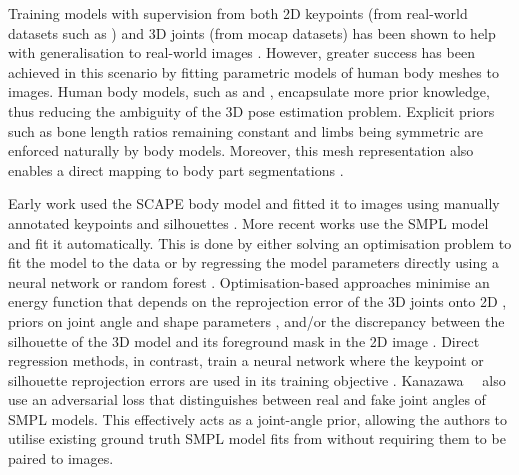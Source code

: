 \documentclass[10pt,twocolumn,letterpaper]{article}
\begin{document}
Training models with supervision from both 2D keypoints (from real-world datasets such as \cite{lin_eccv_2014, andriluka_cvpr_2014, johnson_bmvc_2010}) and 3D joints (from mocap datasets) has been shown to help with generalisation to real-world images \cite{zhou_iccv_2017, rogez_cvpr_2017, mehta_3dv_2017, dabral_eccv_2018, sun_iccv_2017, sun_eccv_2018}.
However, greater success has been achieved in this scenario by fitting parametric models of human body meshes to images.
Human body models, such as \cite{loper_tog_2015} and \cite{anguelov_tog_2005}, encapsulate more prior knowledge, thus reducing the ambiguity of the 3D pose estimation problem.
Explicit priors such as bone length ratios remaining constant \cite{zhou_iccv_2017, dabral_eccv_2018} and limbs being symmetric \cite{dabral_eccv_2018} are enforced naturally by body models.
Moreover, this mesh representation also enables a direct mapping to body part segmentations \cite{lassner_cvpr_2017, pavlakos_cvpr_2018, kanazawa_cvpr_2018}.

Early work used the SCAPE body model \cite{anguelov_tog_2005} and fitted it to images using manually annotated keypoints and silhouettes \cite{guan_iccv_2009, sigal_nips_2008, balan_cvpr_2007, hasler_cvpr_2010}.
More recent works use the SMPL model \cite{loper_tog_2015} and fit it automatically.
This is done by either solving an optimisation problem to fit the model to the data \cite{bogo_eccv_2016, lassner_cvpr_2017, zanfir_cvpr_2018, balan_cvpr_2007} or by regressing the model parameters directly using a neural network \cite{kanazawa_cvpr_2018, omran_3dv_2018, pavlakos_cvpr_2018, tung_nips_2017} or random forest \cite{lassner_cvpr_2017}.
Optimisation-based approaches minimise an energy function that depends on the reprojection error of the 3D joints onto 2D \cite{bogo_eccv_2016, lassner_cvpr_2017}, priors on joint angle and shape parameters \cite{bogo_eccv_2016, lassner_cvpr_2017}, and/or the discrepancy between the silhouette of the 3D model and its foreground mask in the 2D image \cite{lassner_cvpr_2017, balan_cvpr_2007}.
Direct regression methods, in contrast, train a neural network where the keypoint \cite{kanazawa_cvpr_2018, omran_3dv_2018, pavlakos_cvpr_2018} or silhouette reprojection errors are used in its training objective \cite{pavlakos_cvpr_2018, omran_3dv_2018}.
Kanazawa~\etal~\cite{kanazawa_cvpr_2018} also use an adversarial loss that distinguishes between real and fake joint angles of SMPL models.
This effectively acts as a joint-angle prior, allowing the authors to utilise existing ground truth SMPL model fits from \cite{loper_tog_2014} without requiring them to be paired to images.
\end{document}
